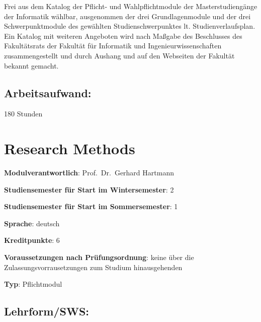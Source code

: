 Frei aus dem Katalog der Pflicht- und Wahlpflichtmodule der
Masterstudiengänge der Informatik wählbar, ausgenommen der drei
Grundlagenmodule und der drei Schwerpunktmodule des gewählten
Studienschwerpunktes lt. Studienverlaufsplan. Ein Katalog mit weiteren
Angeboten wird nach Maßgabe des Beschlusses des Fakultätsrats der
Fakultät für Informatik und Ingenieurwissenschaften zusammengestellt und
durch Aushang und auf den Webseiten der Fakultät bekannt gemacht.

\section*{Arbeitsaufwand:\label{/mi-2017/modulbeschreibungen-master/MA_All_Modul_Wahlpflichtmodule}}\label{arbeitsaufwandpathlabelmi-2017modulbeschreibungen-mastermaux5fallux5fmodulux5fwahlpflichtmodule}

180 Stunden

\chapter{Research
Methods\label{/mi-2017/modulbeschreibungen-master/MA_All_Research_Methods}}\label{research-methodspathlabelmi-2017modulbeschreibungen-mastermaux5fallux5fresearchux5fmethods}

\begin{modulHead}
\textbf{Modulverantwortlich}: Prof.~Dr.~Gerhard
Hartmann
\end{modulHead}
\begin{modulHead}
\textbf{Studiensemester für
Start im Wintersemester}:
2
\end{modulHead}
\begin{modulHead}
\textbf{Studiensemester für Start
im Sommersemester}:
1
\end{modulHead}
\begin{modulHead}
\textbf{Sprache}:
deutsch
\end{modulHead}
\begin{modulHead}
\textbf{Kreditpunkte}:
6
\end{modulHead}
\begin{modulHead}
\textbf{Voraussetzungen nach
Prüfungsordnung}: keine über die Zulassungsvorrausetzungen zum Studium
hinausgehenden
\end{modulHead}
\begin{modulHead}
\textbf{Typ}:
Pflichtmodul
\end{modulHead}


\section*{Lehrform/SWS:\label{/mi-2017/modulbeschreibungen-master/MA_All_Research_Methods}}\label{lehrformswspathlabelmi-2017modulbeschreibungen-mastermaux5fallux5fresearchux5fmethods}

